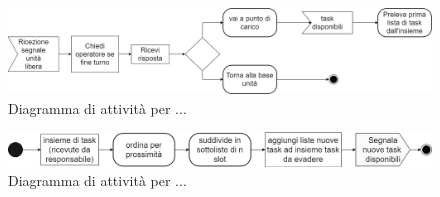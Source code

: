 \begin{figure}[H]
	\centering
	\includegraphics[scale=0.3]{res/images/diagramma_di_attivita1.png}
	\caption{Diagramma di attività per ...}
\end{figure}
\begin{figure}[H]
	\centering
	\includegraphics[scale=0.3]{res/images/diagramma_di_attivita3.png}
	\caption{Diagramma di attività per ...}
\end{figure}

